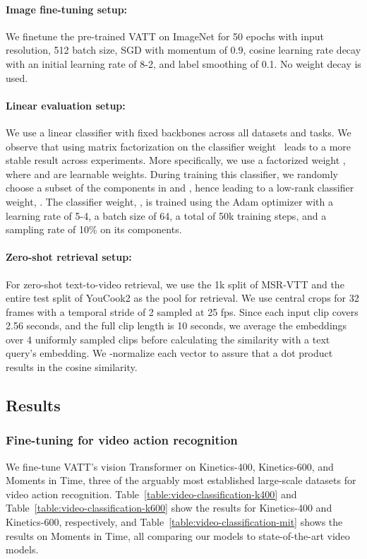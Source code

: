 \documentclass[10pt,twocolumn,letterpaper]{article}
\newcommand{\ours}{VATT\xspace}
\begin{document}
\paragraph{Image fine-tuning setup:} 
We finetune the pre-trained \ours on ImageNet for 50 epochs with  input resolution, 512 batch size, SGD with momentum of 0.9, cosine learning rate decay with an initial learning rate of 8-2, and label smoothing of 0.1. No weight decay is used.

\paragraph{Linear evaluation setup:} 
We use a linear classifier with fixed backbones across all datasets and tasks. We observe that using matrix factorization on the classifier weight~\cite{rendle2010factorization} leads to a more stable result across experiments. More specifically, we use a factorized weight , where  and  are learnable weights. During training this classifier, we randomly choose a subset of the  components in  and , hence leading to a low-rank classifier weight, . The classifier weight, , is trained using the Adam optimizer with a learning rate of 5-4, a batch size of 64, a total of 50k training steps, and a sampling rate of 10\% on its  components.

\paragraph{Zero-shot retrieval setup:} 
For zero-shot text-to-video retrieval, we use the 1k split of MSR-VTT and the entire test split of YouCook2 as the pool for retrieval. We use  central crops for 32 frames with a temporal stride of 2 sampled at 25 fps. Since each input clip covers 2.56 seconds, and the full clip length is 10 seconds, we average the embeddings over 4 uniformly sampled clips before calculating the similarity with a text query's embedding. We -normalize each vector to assure that a dot product results in the cosine similarity.

\subsection{Results}

\subsubsection{Fine-tuning for video action recognition}
We fine-tune \ours's vision Transformer on Kinetics-400, Kinetics-600, and Moments in Time, three of the arguably most established large-scale datasets for video action recognition. Table~\ref{table:video-classification-k400} and Table~\ref{table:video-classification-k600} show the results for Kinetics-400 and Kinetics-600, respectively, and Table~\ref{table:video-classification-mit} shows the results on Moments in Time, all comparing our models to state-of-the-art video models.
\end{document}
